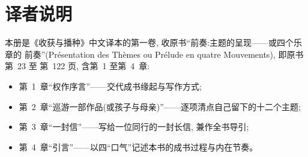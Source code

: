 \documentclass[
    PaperSize=a4paper,
    HeadingFont=hei,
    Biblatex=false,
    BookTitleCN={收获与播种},
    Translator={数译},
    LogoFile=logo.pdf
]{mathtranslation}
\begin{document}
\frontmatter
\makecover

\chapter*{译者说明}

本册是《收获与播种》中文译本的第一卷, 收原书“前奏:主题的呈现——或四个乐章的
前奏”(Présentation des Thèmes ou Prélude en quatre Mouvements), 即原书第~23 至
第~122 页, 含第~1 至第~4~章:

\begin{itemize}
  \item 第~1~章“权作序言”——交代成书缘起与写作方式;
  \item 第~2~章“巡游一部作品(或孩子与母亲)”——逐项清点自己留下的十二个主题;
  \item 第~3~章“一封信”——写给一位同行的一封长信, 兼作全书导引;
  \item 第~4~章“引言”——以四“口气”记述本书的成书过程与内在节奏。
\end{itemize}

\CommonNoteBody

\makecontents

\mainmatter


\setcounter{chapter}{0}








\end{document}
